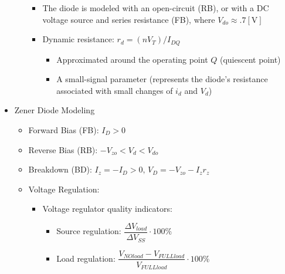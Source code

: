 \begin{itemize}
\begin{itemize}
        \begin{itemize}

          \item The diode is modeled with an open-circuit (RB), or with a DC voltage source and series resistance (FB), where $V_{do}\approx .7[\si{\volt}]$

          \item Dynamic resistance: $r_d=(nV_T)/I_{DQ}$

            \begin{itemize}

              \item Approximated around the operating point $Q$ (quiescent point)

              \item A small-signal parameter (represents the diode's resistance associated with small changes of $i_d$ and $V_d$)

            \end{itemize}

        \end{itemize}

    \end{itemize}

  \item Zener Diode Modeling

    \begin{itemize}

      \item Forward Bias (FB): $I_D>0$

      \item Reverse Bias (RB): $-V_{zo}<V_d<V_{do}$

      \item Breakdown (BD): $I_z=-I_D>0,\, V_D=-V_{zo}-I_zr_z$

      \item Voltage Regulation:

        \begin{itemize}

          \item Voltage regulator quality indicators:

            \begin{itemize}

              \item Source regulation: $\dfrac{\Delta V_{load}}{\Delta V_{SS}}\cdot100\% $

              \item Load regulation: $\dfrac{V_{NOload}-V_{FULLload}}{V_{FULLload}}\cdot100\% $

            \end{itemize}

        \end{itemize}

    \end{itemize}

\end{itemize}



